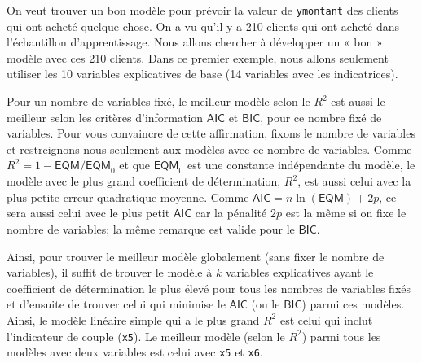 \documentclass[
  11pt,
  letterpaper,
]{scrbook}
\theoremstyle{definition}
\theoremstyle{remark}
\begin{document}
On veut trouver un bon modèle pour prévoir la valeur de
\texttt{ymontant} des clients qui ont acheté quelque chose. On a vu
qu'il y a 210 clients qui ont acheté dans l'échantillon d'apprentissage.
Nous allons chercher à développer un « bon » modèle avec ces 210
clients. Dans ce premier exemple, nous allons seulement utiliser les 10
variables explicatives de base (14 variables avec les indicatrices).

Pour un nombre de variables fixé, le meilleur modèle selon le \(R^2\)
est aussi le meilleur selon les critères d'information \(\mathsf{AIC}\)
et \(\mathsf{BIC}\), pour ce nombre fixé de variables. Pour vous
convaincre de cette affirmation, fixons le nombre de variables et
restreignons-nous seulement aux modèles avec ce nombre de variables.
Comme \(R^2=1 - \mathsf{EQM}/\mathsf{EQM}_0\) et que \(\mathsf{EQM}_0\)
est une constante indépendante du modèle, le modèle avec le plus grand
coefficient de détermination, \(R^2\), est aussi celui avec la plus
petite erreur quadratique moyenne. Comme
\(\mathsf{AIC}=n \ln (\mathsf{EQM}) + 2p\), ce sera aussi celui avec le
plus petit \(\mathsf{AIC}\) car la pénalité \(2p\) est la même si on
fixe le nombre de variables; la même remarque est valide pour le
\(\mathsf{BIC}\).

Ainsi, pour trouver le meilleur modèle globalement (sans fixer le nombre
de variables), il suffit de trouver le modèle à \(k\) variables
explicatives ayant le coefficient de détermination le plus élevé pour
tous les nombres de variables fixés et d'ensuite de trouver celui qui
minimise le \(\mathsf{AIC}\) (ou le \(\mathsf{BIC}\)) parmi ces modèles.
Ainsi, le modèle linéaire simple qui a le plus grand \(R^2\) est celui
qui inclut l'indicateur de couple (\texttt{x5}). Le meilleur modèle
(selon le \(R^2\)) parmi tous les modèles avec deux variables est celui
avec \texttt{x5} et \texttt{x6}.
\end{document}

